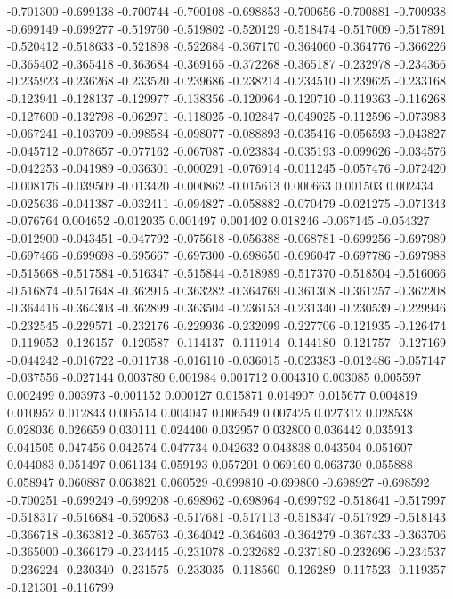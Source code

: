 -0.701300
-0.699138
-0.700744
-0.700108
-0.698853
-0.700656
-0.700881
-0.700938
-0.699149
-0.699277
-0.519760
-0.519802
-0.520129
-0.518474
-0.517009
-0.517891
-0.520412
-0.518633
-0.521898
-0.522684
-0.367170
-0.364060
-0.364776
-0.366226
-0.365402
-0.365418
-0.363684
-0.369165
-0.372268
-0.365187
-0.232978
-0.234366
-0.235923
-0.236268
-0.233520
-0.239686
-0.238214
-0.234510
-0.239625
-0.233168
-0.123941
-0.128137
-0.129977
-0.138356
-0.120964
-0.120710
-0.119363
-0.116268
-0.127600
-0.132798
-0.062971
-0.118025
-0.102847
-0.049025
-0.112596
-0.073983
-0.067241
-0.103709
-0.098584
-0.098077
-0.088893
-0.035416
-0.056593
-0.043827
-0.045712
-0.078657
-0.077162
-0.067087
-0.023834
-0.035193
-0.099626
-0.034576
-0.042253
-0.041989
-0.036301
-0.000291
-0.076914
-0.011245
-0.057476
-0.072420
-0.008176
-0.039509
-0.013420
-0.000862
-0.015613
0.000663
0.001503
0.002434
-0.025636
-0.041387
-0.032411
-0.094827
-0.058882
-0.070479
-0.021275
-0.071343
-0.076764
0.004652
-0.012035
0.001497
0.001402
0.018246
-0.067145
-0.054327
-0.012900
-0.043451
-0.047792
-0.075618
-0.056388
-0.068781
-0.699256
-0.697989
-0.697466
-0.699698
-0.695667
-0.697300
-0.698650
-0.696047
-0.697786
-0.697988
-0.515668
-0.517584
-0.516347
-0.515844
-0.518989
-0.517370
-0.518504
-0.516066
-0.516874
-0.517648
-0.362915
-0.363282
-0.364769
-0.361308
-0.361257
-0.362208
-0.364416
-0.364303
-0.362899
-0.363504
-0.236153
-0.231340
-0.230539
-0.229946
-0.232545
-0.229571
-0.232176
-0.229936
-0.232099
-0.227706
-0.121935
-0.126474
-0.119052
-0.126157
-0.120587
-0.114137
-0.111914
-0.144180
-0.121757
-0.127169
-0.044242
-0.016722
-0.011738
-0.016110
-0.036015
-0.023383
-0.012486
-0.057147
-0.037556
-0.027144
0.003780
0.001984
0.001712
0.004310
0.003085
0.005597
0.002499
0.003973
-0.001152
0.000127
0.015871
0.014907
0.015677
0.004819
0.010952
0.012843
0.005514
0.004047
0.006549
0.007425
0.027312
0.028538
0.028036
0.026659
0.030111
0.024400
0.032957
0.032800
0.036442
0.035913
0.041505
0.047456
0.042574
0.047734
0.042632
0.043838
0.043504
0.051607
0.044083
0.051497
0.061134
0.059193
0.057201
0.069160
0.063730
0.055888
0.058947
0.060887
0.063821
0.060529
-0.699810
-0.699800
-0.698927
-0.698592
-0.700251
-0.699249
-0.699208
-0.698962
-0.698964
-0.699792
-0.518641
-0.517997
-0.518317
-0.516684
-0.520683
-0.517681
-0.517113
-0.518347
-0.517929
-0.518143
-0.366718
-0.363812
-0.365763
-0.364042
-0.364603
-0.364279
-0.367433
-0.363706
-0.365000
-0.366179
-0.234445
-0.231078
-0.232682
-0.237180
-0.232696
-0.234537
-0.236224
-0.230340
-0.231575
-0.233035
-0.118560
-0.126289
-0.117523
-0.119357
-0.121301
-0.116799
